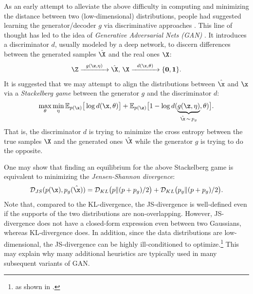 \documentclass[../../book-main.tex]{subfiles}
\begin{document}
As an early attempt to alleviate the above difficulty in computing and minimizing the distance between two (low-dimensional) distributions, people had suggested learning the generator/decoder $g$ via discriminative approaches \cite{Tu-2007}. This line of thought has led to the idea of {\em Generative Adversarial Nets (GAN)} \cite{goodfellow2014generative}. It introduces a discriminator $d$, usually modeled by a deep network, to discern differences between the generated samples $\hat \X$ and the real ones $\X$:
\begin{equation}
 \Z \xrightarrow{\hspace{2mm} g(\z,\eta) \hspace{2mm}} \hat \X, \, \X \xrightarrow{\hspace{2mm} d(\x, \theta)\hspace{2mm}} \{\mathbf 0, \mathbf 1\}.
 \label{eqn:GAN}
\end{equation}
It is suggested that we may attempt to align the distributions between $\hat \x$ and $\x$ via a {\em Stackelberg game} between the generator $g$ and the discriminator $d$:
\begin{equation}
\max_{\theta}\min_{\eta} \mathbb{E}_{p({\x})}\big[\log d(\x,\theta)\big] + \mathbb{E}_{p({\z})}\big[1 - \log d(\underbrace{g(\z,\eta)}_{\hat \x \,\sim\, p_g},\theta)\big].
\end{equation}
That is, the discriminator $d$ is trying to minimize the cross entropy between the true samples $\X$ and the generated ones $\hat \X$ while the generator $g$ is trying to do  the opposite. 

One may show that finding an equilibrium for the above Stackelberg game is equivalent to minimizing the {\em Jensen-Shannon divergence}:
\begin{equation}
    \mathcal{D}_{JS}(p(\x), p_g(\hat \x)) = \mathcal{D}_{KL}\big(p \| (p + p_g)/{2}\big) + \mathcal{D}_{KL}\big(p_g \| (p + p_g)/{2}\big).
\end{equation}
Note that, compared to the KL-divergence, the JS-divergence is well-defined even if the supports of the two distributions are non-overlapping. However, JS-divergence does not have a closed-form expression even between two Gaussians, whereas KL-divergence does. In addition, since the data distributions are low-dimensional, the JS-divergence can be highly ill-conditioned to optimize.\footnote{as shown in \cite{arjovsky2017wasserstein}.} This may explain why many additional heuristics are typically used in many subsequent variants of GAN. 
\end{document}
